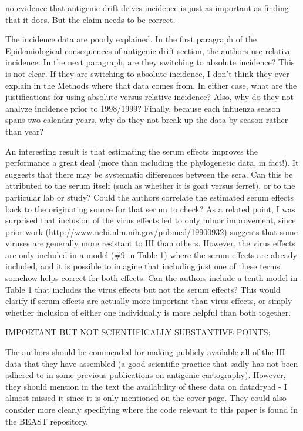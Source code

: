 \documentclass[11pt,oneside,letterpaper]{article}
\begin{document}
no evidence that antigenic drift drives incidence is just as important as finding that it does. But the claim needs to be correct.

The incidence data are poorly explained. In the first paragraph of the Epidemiological consequences of antigenic drift section, the authors use relative incidence. In the next paragraph, are they switching to absolute incidence? This is not clear. If they are switching to absolute incidence, I don't think they ever explain in the Methods where that data comes from. In either case, what are the justifications for using absolute versus relative incidence? Also, why do they not analyze incidence prior to 1998/1999? Finally, because each influenza season spans two calendar years, why do they not break up the data by season rather than year?

An interesting result is that estimating the serum effects improves the performance a great deal (more than including the phylogenetic data, in fact!). It suggests that there may be systematic differences between the sera. Can this be attributed to the serum itself (such as whether it is goat versus ferret), or to the particular lab or study? Could the authors correlate the estimated serum effects back to the originating source for that serum to check? As a related point, I was surprised that inclusion of the virus effects led to only minor improvement, since prior work (http://www.ncbi.nlm.nih.gov/pubmed/19900932) suggests that some viruses are generally more resistant to HI than others. However, the virus effects are only included in a model (\#9 in Table 1) where the serum effects are already included, and it is possible to imagine that including just one of these terms somehow helps correct for both effects. Can the authors include a tenth model in Table 1 that includes the virus effects but not the serum effects? This would clarify if serum effects are actually more important than virus effects, or simply whether inclusion of either one individually is more helpful than both together.

IMPORTANT BUT NOT SCIENTIFICALLY SUBSTANTIVE POINTS: 

The authors should be commended for making publicly available all of the HI data that they have assembled (a good scientific practice that sadly has not been adhered to in some previous publications on antigenic cartography). However, they should mention in the text the availability of these data on datadryad - I almost missed it since it is only mentioned on the cover page. They could also consider more clearly specifying where the code relevant to this paper is found in the BEAST repository.
\end{document}
